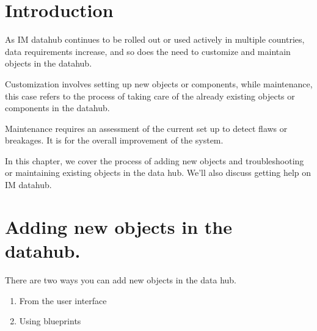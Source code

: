 \documentclass[]{book}
\providecommand{\tightlist}{%
  \setlength{\itemsep}{0pt}\setlength{\parskip}{0pt}}
\begin{document}
\hypertarget{introduction-4}{%
\section{Introduction}\label{introduction-4}}

As IM datahub continues to be rolled out or used actively in multiple countries, data requirements increase, and so does the need to customize and maintain objects in the datahub.

Customization involves setting up new objects or components, while maintenance, this case refers to the process of taking care of the already existing objects or components in the datahub.

Maintenance requires an assessment of the current set up to detect flaws or breakages. It is for the overall improvement of the system.

In this chapter, we cover the process of adding new objects and troubleshooting or maintaining existing objects in the data hub. We'll also discuss getting help on IM datahub.

\hypertarget{adding-new-objects-in-the-datahub.}{%
\section{Adding new objects in the datahub.}\label{adding-new-objects-in-the-datahub.}}

There are two ways you can add new objects in the data hub.

\begin{enumerate}
\def\labelenumi{\arabic{enumi}.}
\tightlist
\item
  From the user interface
\item
  Using blueprints
\end{enumerate}


\end{document}
